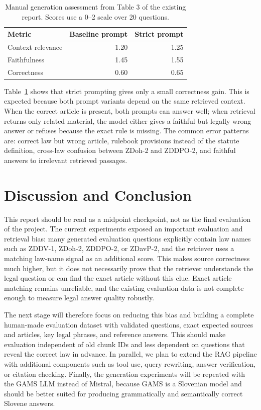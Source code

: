 \documentclass[fleqn,moreauthors,10pt]{ds_report}
\begin{document}
\begin{table}[hbt]
\caption{Manual generation assessment from Table 3 of the existing report. Scores use a 0--2 scale over 20 questions.}
\centering
\small
\begin{tabular}{lrr}
\toprule
Metric & Baseline prompt & Strict prompt \\
\midrule
Context relevance & 1.20 & 1.25 \\
Faithfulness & 1.45 & 1.55 \\
Correctness & 0.60 & 0.65 \\
\bottomrule
\end{tabular}
\label{tab:manual}
\end{table}

Table~\ref{tab:manual} shows that strict prompting gives only a small correctness gain. This is expected because both prompt variants depend on the same retrieved context. When the correct article is present, both prompts can answer well; when retrieval returns only related material, the model either gives a faithful but legally wrong answer or refuses because the exact rule is missing. The common error patterns are: correct law but wrong article, rulebook provisions instead of the statute definition, cross-law confusion between ZDoh-2 and ZDDPO-2, and faithful answers to irrelevant retrieved passages.

\section*{Discussion and Conclusion}

This report should be read as a midpoint checkpoint, not as the final evaluation of the project. The current experiments exposed an important evaluation and retrieval bias: many generated evaluation questions explicitly contain law names such as ZDDV-1, ZDoh-2, ZDDPO-2, or ZDavP-2, and the retriever uses a matching law-name signal as an additional score. This makes source correctness much higher, but it does not necessarily prove that the retriever understands the legal question or can find the exact article without this clue. Exact article matching remains unreliable, and the existing evaluation data is not complete enough to measure legal answer quality robustly.

The next stage will therefore focus on reducing this bias and building a complete human-made evaluation dataset with validated questions, exact expected sources and articles, key legal phrases, and reference answers. This should make evaluation independent of old chunk IDs and less dependent on questions that reveal the correct law in advance. In parallel, we plan to extend the RAG pipeline with additional components such as tool use, query rewriting, answer verification, or citation checking. Finally, the generation experiments will be repeated with the GAMS LLM instead of Mistral, because GAMS is a Slovenian model and should be better suited for producing grammatically and semantically correct Slovene answers.
\end{document}
